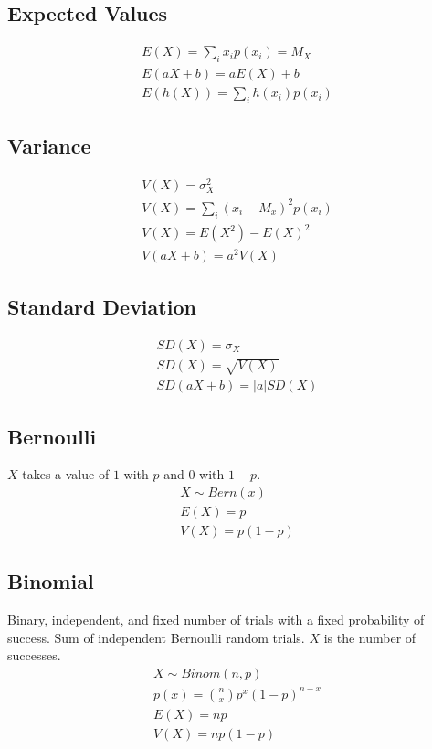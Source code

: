 \subsection{Expected Values}
\begin{align}
  E(X) = \sum_{i}^{} x_ip(x_i) = M_X \\
  E(aX + b) = aE(X) + b \\
  E(h(X)) = \sum_{i}^{} h(x_i)p(x_i)
\end{align}

\subsection{Variance}
\begin{align}
  V(X) = \sigma^2_X \\
  V(X) = \sum_{i}^{}(x_i - M_x)^2p(x_i) \\
  V(X) = E(X^2) - E(X)^2 \\
  V(aX + b) = a^2V(X)
\end{align}

\subsection{Standard Deviation}
\begin{align}
  SD(X) = \sigma_X \\
  SD(X) = \sqrt{V(X)} \\
  SD(aX + b) = \lvert a \rvert SD(X)
\end{align}

\subsection{Bernoulli}
$X$ takes a value of $1$ with $p$ and $0$ with $1-p$.
\begin{align}
  X \sim Bern(x) \\
  E(X) = p \\
  V(X) = p(1 - p)
\end{align}

\subsection{Binomial}
Binary, independent, and fixed number of trials with a fixed probability of success. Sum of independent Bernoulli random trials. $X$ is the number of successes.
\begin{align}
  X \sim Binom(n, p) \\
  p(x) = \binom{n}{x}p^x(1 - p)^{n - x} \\
  E(X) = np \\
  V(X) = np(1 - p)
\end{align}

